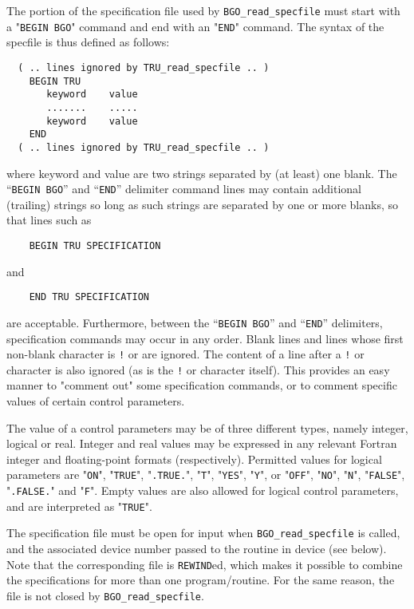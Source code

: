 \documentclass{galahad}
\newcommand{\packagename}{BGO}
\begin{document}
The portion of the specification file used by
{\tt \packagename\_read\_specfile}
must start
with a "{\tt BEGIN \packagename}" command and end with an
"{\tt END}" command.  The syntax of the specfile is thus defined as follows:
\begin{verbatim}
  ( .. lines ignored by TRU_read_specfile .. )
    BEGIN TRU
       keyword    value
       .......    .....
       keyword    value
    END
  ( .. lines ignored by TRU_read_specfile .. )
\end{verbatim}
where keyword and value are two strings separated by (at least) one blank.
The ``{\tt BEGIN \packagename}'' and ``{\tt END}'' delimiter command lines
may contain additional (trailing) strings so long as such strings are
separated by one or more blanks, so that lines such as
\begin{verbatim}
    BEGIN TRU SPECIFICATION
\end{verbatim}
and
\begin{verbatim}
    END TRU SPECIFICATION
\end{verbatim}
are acceptable. Furthermore,
between the
``{\tt BEGIN \packagename}'' and ``{\tt END}'' delimiters,
specification commands may occur in any order.  Blank lines and
lines whose first non-blank character is {\tt !} or {\tt *} are ignored.
The content
of a line after a {\tt !} or {\tt *} character is also
ignored (as is the {\tt !} or {\tt *}
character itself). This provides an easy manner to "comment out" some
specification commands, or to comment specific values
of certain control parameters.

The value of a control parameters may be of three different types, namely
integer, logical or real.
Integer and real values may be expressed in any relevant Fortran integer and
floating-point formats (respectively). Permitted values for logical
parameters are "{\tt ON}", "{\tt TRUE}", "{\tt .TRUE.}", "{\tt T}",
"{\tt YES}", "{\tt Y}", or "{\tt OFF}", "{\tt NO}",
"{\tt N}", "{\tt FALSE}", "{\tt .FALSE.}" and "{\tt F}".
Empty values are also allowed for
logical control parameters, and are interpreted as "{\tt TRUE}".

The specification file must be open for
input when {\tt \packagename\_read\_specfile}
is called, and the associated device number
passed to the routine in device (see below).
Note that the corresponding
file is {\tt REWIND}ed, which makes it possible to combine the specifications
for more than one program/routine.  For the same reason, the file is not
closed by {\tt \packagename\_read\_specfile}.
\end{document}
